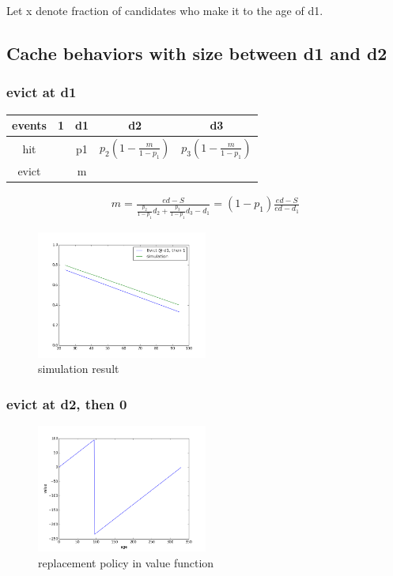 \documentclass[12pt, letterpaper]{article}
\begin{document}
Let x denote fraction of candidates who make it to the age of d1.

\subsection{Cache behaviors with size between d1 and d2}

\subsubsection{evict at d1}
\label{sec:policyd1}


\begin{center}
\begin{tabular}{c | c c c c}
\hline
events & 1 & d1 & d2 & d3 \\
\hline
hit & & p1 & $p_2 (1-\frac{m}{1-p_1}) $ & $p_3(1-\frac{m}{1-p_1}) $ \\
evict & & m & & \\
\hline
\end{tabular}
\end{center}

\begin{equation}
\begin{aligned}
m = \frac{ed-S}{\frac{p_2}{1-p_1} d_2 + \frac{p_3}{1-p_1} d_3 - d_1}
= (1-p_1) \frac{ed-S}{ed-d_1}
\end{aligned}
\end{equation}

\begin{figure}[H]
\centering
\includegraphics[width=0.5\textwidth]{sim_d1.png}
\caption{simulation result}
\end{figure}

\subsubsection{evict at d2, then 0}

\begin{figure}[H]
\centering
\includegraphics[width=0.5\textwidth]{evict_d2.png}
\caption{replacement policy in value function}
\end{figure}
\end{document}
